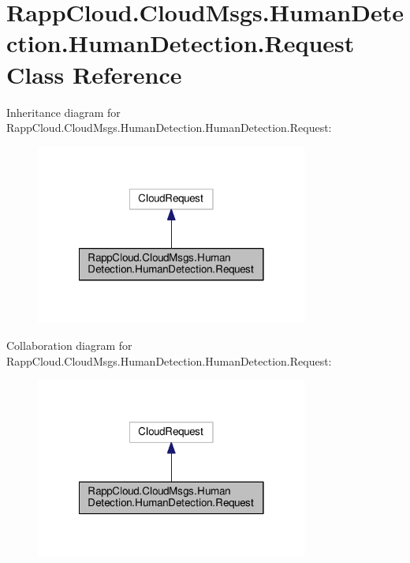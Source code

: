 \hypertarget{classRappCloud_1_1CloudMsgs_1_1HumanDetection_1_1HumanDetection_1_1Request}{\section{Rapp\-Cloud.\-Cloud\-Msgs.\-Human\-Detection.\-Human\-Detection.\-Request Class Reference}
\label{classRappCloud_1_1CloudMsgs_1_1HumanDetection_1_1HumanDetection_1_1Request}
}


Inheritance diagram for Rapp\-Cloud.\-Cloud\-Msgs.\-Human\-Detection.\-Human\-Detection.\-Request\-:
\nopagebreak
\begin{figure}[H]
\begin{center}
\leavevmode
\includegraphics[width=254pt]{classRappCloud_1_1CloudMsgs_1_1HumanDetection_1_1HumanDetection_1_1Request__inherit__graph}
\end{center}
\end{figure}


Collaboration diagram for Rapp\-Cloud.\-Cloud\-Msgs.\-Human\-Detection.\-Human\-Detection.\-Request\-:
\nopagebreak
\begin{figure}[H]
\begin{center}
\leavevmode
\includegraphics[width=254pt]{classRappCloud_1_1CloudMsgs_1_1HumanDetection_1_1HumanDetection_1_1Request__coll__graph}
\end{center}
\end{figure}
